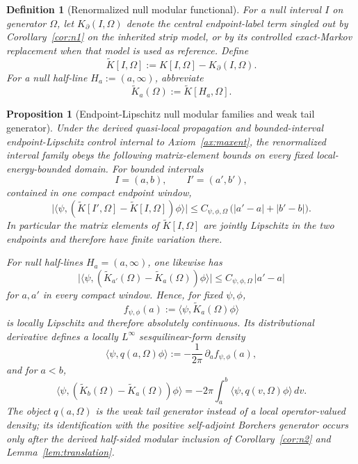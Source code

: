 \documentclass[11pt]{article}
\newtheorem{proposition}[theorem]{Proposition}
\newtheorem{definition}[theorem]{Definition}
\begin{document}
\begin{definition}[Renormalized null modular functional]
For a null interval \(I\) on generator \(\Omega\), let \(K_\partial(I,\Omega)\) denote the central endpoint-label term singled out by Corollary~\ref{cor:n1} on the inherited strip model, or by its controlled exact-Markov replacement when that model is used as reference. Define
\[
\widetilde K[I,\Omega]
:=
K[I,\Omega]-K_\partial(I,\Omega).
\]
For a null half-line \(H_a:=(a,\infty)\), abbreviate
\[
\widetilde K_a(\Omega):=\widetilde K[H_a,\Omega].
\]
\end{definition}

\begin{proposition}[Endpoint-Lipschitz null modular families and weak tail generator]\label{prop:n3}
Under the derived quasi-local propagation and bounded-interval endpoint-Lipschitz control internal to Axiom~\ref{ax:maxent}, the renormalized interval family obeys the following matrix-element bounds on every fixed local-energy-bounded domain. For bounded intervals
\[
I=(a,b),\qquad
I'=(a',b'),
\]
contained in one compact endpoint window,
\[
\bigl|\langle \psi,(\widetilde K[I',\Omega]-\widetilde K[I,\Omega])\phi\rangle\bigr|
\le
C_{\psi,\phi,\Omega}\,\bigl(|a'-a|+|b'-b|\bigr).
\]
In particular the matrix elements of \(\widetilde K[I,\Omega]\) are jointly Lipschitz in the two endpoints and therefore have finite variation there.

For null half-lines \(H_a=(a,\infty)\), one likewise has
\[
\bigl|\langle \psi,(\widetilde K_{a'}(\Omega)-\widetilde K_a(\Omega))\phi\rangle\bigr|
\le
C_{\psi,\phi,\Omega}\,|a'-a|
\]
for \(a,a'\) in every compact window. Hence, for fixed \(\psi,\phi\),
\[
f_{\psi,\phi}(a):=\langle\psi,\widetilde K_a(\Omega)\phi\rangle
\]
is locally Lipschitz and therefore absolutely continuous. Its distributional derivative defines a locally \(L^\infty\) sesquilinear-form density
\[
\langle\psi,q(a,\Omega)\phi\rangle
:=
-\frac{1}{2\pi}\,\partial_a f_{\psi,\phi}(a),
\]
and for \(a<b\),
\[
\langle\psi,(\widetilde K_b(\Omega)-\widetilde K_a(\Omega))\phi\rangle
=
-2\pi\int_a^b \langle\psi,q(v,\Omega)\phi\rangle\,dv.
\]
The object \(q(a,\Omega)\) is the weak tail generator instead of a local operator-valued density; its identification with the positive self-adjoint Borchers generator occurs only after the derived half-sided modular inclusion of Corollary~\ref{cor:n2} and Lemma~\ref{lem:translation}.
\end{proposition}
\end{document}
